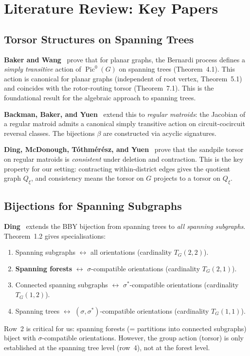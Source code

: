 \documentclass[11pt]{article}
\newcommand{\Pic}{\operatorname{Pic}^0}
\begin{document}
\section{Literature Review: Key Papers}

\subsection{Torsor Structures on Spanning Trees}

\textbf{Baker and Wang}~\cite{baker2018bernardi} prove that for planar graphs,
the Bernardi process defines a \emph{simply transitive} action of $\Pic(G)$ on
spanning trees (Theorem~4.1). This action is canonical for planar graphs
(independent of root vertex, Theorem~5.1) and coincides with the rotor-routing
torsor (Theorem~7.1). This is the foundational result for the algebraic
approach to spanning trees.

\textbf{Backman, Baker, and Yuen}~\cite{backman2019geometric} extend this to
\emph{regular matroids}: the Jacobian of a regular matroid admits a canonical
simply transitive action on circuit-cocircuit reversal classes. The bijections
$\beta$ are constructed via acyclic signatures.

\textbf{Ding, McDonough, T\'othm\'er\'esz, and Yuen}~\cite{ding2025consistent}
prove that the sandpile torsor on regular matroids is \emph{consistent} under
deletion and contraction. This is the key property for our setting: contracting
within-district edges gives the quotient graph $Q_\xi$, and consistency means
the torsor on $G$ projects to a torsor on $Q_\xi$.

\subsection{Bijections for Spanning Subgraphs}

\textbf{Ding}~\cite{ding2023geometric} extends the BBY bijection from spanning
trees to \emph{all spanning subgraphs}. Theorem~1.2 gives specialisations:
\begin{enumerate}
  \item Spanning subgraphs $\leftrightarrow$ all orientations (cardinality
    $T_G(2,2)$).
  \item \textbf{Spanning forests} $\leftrightarrow$ $\sigma$-compatible
    orientations (cardinality $T_G(2,1)$).
  \item Connected spanning subgraphs $\leftrightarrow$ $\sigma^*$-compatible
    orientations (cardinality $T_G(1,2)$).
  \item Spanning trees $\leftrightarrow$ $(\sigma, \sigma^*)$-compatible
    orientations (cardinality $T_G(1,1)$).
\end{enumerate}
Row~2 is critical for us: spanning forests (= partitions into connected
subgraphs) biject with $\sigma$-compatible orientations. However, the group
action (torsor) is only established at the spanning tree level (row~4), not at
the forest level.
\end{document}

